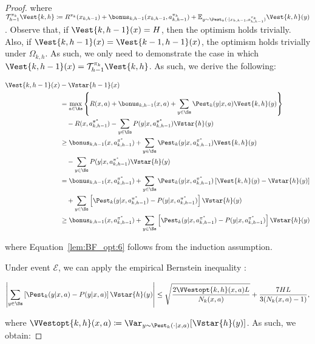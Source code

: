 \begin{proof}
where $\mathcal{T}_{h-1}^{\pi_k} \Vest{k,h} \coloneqq R^{\pi_k}(x_{k,h-1}) + \bonus_{k, h-1}(x_{k,h-1}, a_{k,h-1}^{\pi_k}) + \mathbb{E}_{y \sim \Pest_k(\cdot|x_{k,h-1}, a_{k,h-1}^{\pi_k})} \Vest{k,h}(y)$.
Observe that, if $\Vest{k, h-1}(x) = H$, then the optimism holds trivially. Also, if $\Vest{k, h-1}(x) = \Vest{k-1, h-1}(x)$, the optimism holds trivially under $\Omega_{k,h}$. As such, we only need to demonstrate the case in which $\Vest{k,h-1}(x) = \mathcal{T}_{h-1}^{\pi_k} \Vest{k,h}$. As such, we derive the following:

\begin{align}
    \Vest{k,h-1}(x) &- \Vstar{h-1}(x) \nonumber \\
    &= \max_{a \in \As} \left\{ R(x, a) + \bonus_{k,h-1}(x,a) + \sum_{y \in \Ss} \Pest_k (y | x, a) \Vest{k, h}(y) \right\} \nonumber \\
    &\quad - R(x, a_{k,h-1}^{\pi^*}) - \sum_{y \in \Ss} P(y | x, a_{k,h-1}^{\pi^*}) \Vstar{h}(y) \nonumber \\
    &\ge  \bonus_{k, h-1}(x, a_{k,h-1}^{\pi^*}) + \sum_{y \in \Ss} \Pest_k (y | x,a_{k,h-1}^{\pi^*}) \Vest{k, h}(y) \nonumber \\
    &\quad - \sum_{y \in \Ss} P(y | x, a_{k,h-1}^{\pi^*}) \Vstar{h}(y) \nonumber \\
    &= \bonus_{k, h-1}(x, a_{k,h-1}^{\pi^*}) + \sum_{y \in \Ss} \Pest_k (y | x,a_{k,h-1}^{\pi^*}) \left[ \Vest{k,h}(y) - \Vstar{h}(y) \right] \nonumber \\
    &\quad + \sum_{y \in \Ss} \left[ \Pest_k (y | x,a_{k,h-1}^{\pi^*}) - P(y | x, a_{k,h-1}^{\pi^*}) \right] \Vstar{h}(y) \nonumber \\
    &\ge \bonus_{k, h-1}(x, a_{k,h-1}^{\pi^*}) + \sum_{y \in \Ss} \left[ \Pest_k (y | x,a_{k,h-1}^{\pi^*}) - P(y | x, a_{k,h-1}^{\pi^*}) \right] \Vstar{h}(y) \label{lem:BF_opt:6}
\end{align}

where Equation~\eqref{lem:BF_opt:6} follows from the induction assumption.

Under event $\mathcal{E}$, we can apply the empirical Bernstein inequality \citep{maurer2009}:

\begin{equation*}
    \left| \sum_{y \in \Ss} \left[ \Pest_k (y | x,a) - P(y | x, a) \right] \Vstar{h}(y) \right| \le \sqrt{\frac{2 \VVestopt{k,h}(x,a)L}{N_k (x,a)}} + \frac{7 HL}{3 (N_k(x,a)-1)},
\end{equation*}

where $\VVestopt{k,h}(x,a) \coloneqq \Var_{y \sim \Pest_k (\cdot | x,a)} [\Vstar{h}(y)]$. As such, we obtain:


\end{proof}

